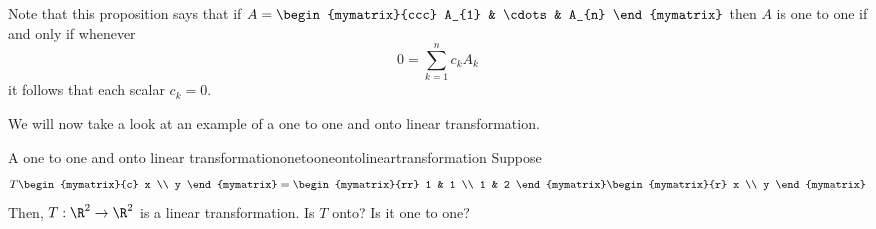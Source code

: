 Note that this proposition says that if $A=\begin{mymatrix}{ccc}
A_{1} & \cdots & A_{n}
\end{mymatrix} $ then $A$ is one to one if and only if whenever
\begin{equation*}
0 = \sum_{k=1}^{n}c_{k}A_{k}
\end{equation*}
it follows that each scalar $c_{k}=0$. 

We will now take a look at an example of a one to one and onto linear transformation. 

\begin{example}{A one to one and onto linear transformation}{onetooneontolineartransformation}
Suppose
\begin{equation*}
T\begin{mymatrix}{c}
x \\
y
\end{mymatrix} =\begin{mymatrix}{rr}
1 & 1 \\
1 & 2
\end{mymatrix} \begin{mymatrix}{r}
x \\
y
\end{mymatrix}
\end{equation*}
Then, $T:\R^{2}\rightarrow \R^{2}$ is a linear
transformation. Is $T$ onto? Is it one to one?
\end{example}

